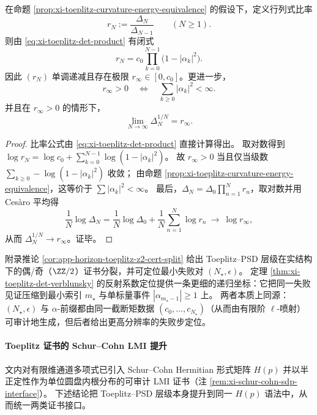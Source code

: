 \begin{proposition}\label{prop:xi-toeplitz-determinant-ratio-limit-l2}
在命题 \ref{prop:xi-toeplitz-curvature-energy-equivalence} 的假设下，定义行列式比率
\[
r_N:=\frac{\Delta_N}{\Delta_{N-1}}\qquad(N\ge 1).
\]
则由 \eqref{eq:xi-toeplitz-det-product} 有闭式
\[
\boxed{\;
r_N=c_0\prod_{k=0}^{N-1}\bigl(1-|\alpha_k|^2\bigr).\;}
\]
因此 \((r_N)\) 单调递减且存在极限 \(r_\infty\in[0,c_0]\)。更进一步，
\[
\boxed{\;
r_\infty>0
\quad\Longleftrightarrow\quad
\sum_{k\ge 0}|\alpha_k|^2<\infty.\;}
\]
并且在 \(r_\infty>0\) 的情形下，
\[
\boxed{\;\lim_{N\to\infty}\Delta_N^{1/N}=r_\infty.\;}
\]
\end{proposition}
\begin{proof}
比率公式由 \eqref{eq:xi-toeplitz-det-product} 直接计算得出。
取对数得到
\(
\log r_N=\log c_0+\sum_{k=0}^{N-1}\log(1-|\alpha_k|^2)
\)。
故 \(r_\infty>0\) 当且仅当级数 \(\sum_{k\ge 0}-\log(1-|\alpha_k|^2)\) 收敛；
由命题 \ref{prop:xi-toeplitz-curvature-energy-equivalence}，这等价于 \(\sum|\alpha_k|^2<\infty\)。
最后，\(\Delta_N=\Delta_0\prod_{n=1}^N r_n\)，取对数并用 Ces\`aro 平均得
\[
\frac{1}{N}\log\Delta_N=\frac{1}{N}\log\Delta_0+\frac{1}{N}\sum_{n=1}^N\log r_n\ \longrightarrow\ \log r_\infty,
\]
从而 \(\Delta_N^{1/N}\to r_\infty\)。证毕。
\end{proof}

\begin{remark}\label{rem:xi-verblunsky-z2-compatible}
附录推论 \ref{cor:app-horizon-toeplitz-z2-cert-split} 给出 Toeplitz--PSD 层级在实结构下的偶/奇（\(\ZZ/2\)）证书分裂，并可定位最小失败对 \((N_\star,\epsilon)\)。
定理 \ref{thm:xi-toeplitz-det-verblunsky} 的反射系数定位提供一条更细的递归坐标：它把同一失败见证压缩到最小索引 \(m_\star\) 与单标量事件 \(|\alpha_{m_\star-1}|\ge 1\) 上。
两者本质上同源：\((N_\star,\epsilon)\) 与 \(\alpha\)-前缀都由同一截断矩数据 \((c_0,\dots,c_{N_\star})\)（从而由有限阶 \(\ell\)-喷射）可审计地生成，但后者给出更高分辨率的失败步定位。
\end{remark}

\paragraph{Toeplitz 证书的 Schur--Cohn LMI 提升}
文内对有限维通道多项式已引入 Schur--Cohn Hermitian 形式矩阵 \(H(p)\) 并以半正定性作为单位圆盘内根分布的可审计 LMI 证书（注 \ref{rem:xi-schur-cohn-sdp-interface}）。
下述结论把 Toeplitz--PSD 层级本身提升到同一 \(H(p)\) 语法中，从而统一两类证书接口。

